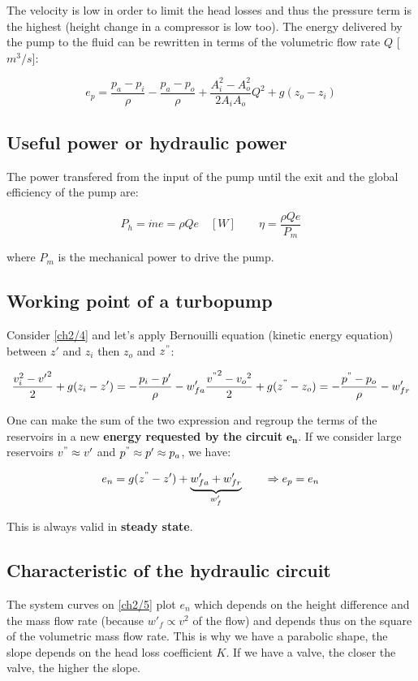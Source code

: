 The velocity is low in order to limit the head losses and thus the pressure term is the highest (height change in a compressor is low too). The energy delivered by the pump to the fluid can be rewritten in terms of the volumetric flow rate $Q$ [$m^3/s$]: 

\begin{equation}
e_p = \frac{p_a - p_i}{\rho} - \frac{p_a - p_o}{\rho} + \frac{A_i^2-A_o^2}{2A_iA_o}Q^2 + g(z_o-z_i)
\end{equation}

\subsection{Useful power or hydraulic power}
The power transfered from the input of the pump until the exit and the global efficiency of the pump are: 

\begin{equation}
P_h  = \dot{m}e = \rho Q e \quad [W] \qquad \eta = \frac{\rho Q e}{P_m}
\end{equation}

where $P_m$ is the mechanical power to drive the pump. 

\subsection{Working point of a turbopump}
Consider \autoref{ch2/4} and let's apply Bernouilli equation (kinetic energy equation) between $z'$ and $z_i$ then $z_o$ and $z^"$: 

\begin{equation}
\frac{v_i^2 - {v'}^2}{2} + g(z_i - z') = -\frac{p_i - p'}{\rho} -w'_{fa} \\ \frac{{v^"}^2 - {v_o}^2}{2} + g(z^" - z_o) = -\frac{p^" - p_o}{\rho} -w'_{fr}
\end{equation}

One can make the sum of the two expression and regroup the terms of the reservoirs in a new \textbf{energy requested by the circuit} $\bm{e_n}$. If we consider large reservoirs $v^" \approx v'$ and $p^"\approx p' \approx p_a$, we have: 

\begin{equation}
e_n = g(z^"-z') + \underbrace{w'_{fa} + w'_{fr}}_{w'_f} \qquad \Rightarrow e_p = e_n 
\end{equation}

This is always valid in \textbf{steady state}. 

\subsection{Characteristic of the hydraulic circuit}
The system curves on \autoref{ch2/5} plot $e_n$ which depends on the height difference and the mass flow rate (because $w'_f\propto v^2$ of the flow) and depends thus on the square of the volumetric mass flow rate. This is why we have a parabolic shape, the slope depends on the head loss coefficient $K$. If we have a valve, the closer the valve, the higher the slope. 

